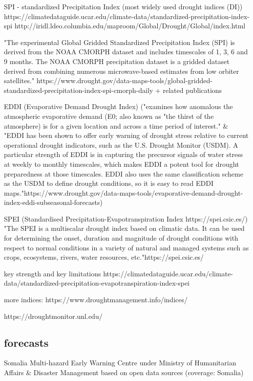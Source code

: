 SPI - standardized Precipitation Index (most widely used drought indices (DI)) 
https://climatedataguide.ucar.edu/climate-data/standardized-precipitation-index-spi
http://iridl.ldeo.columbia.edu/maproom/Global/Drought/Global/index.html

"The experimental Global Gridded Standardized Precipitation Index (SPI) is derived from the NOAA CMORPH dataset and includes timescales of 1, 3, 6 and 9 months.  The NOAA CMORPH precipitation dataset is a gridded dataset derived from combining numerous microwave-based estimates from low orbiter satellites." https://www.drought.gov/data-maps-tools/global-gridded-standardized-precipitation-index-spi-cmorph-daily + related publications

EDDI (Evaporative Demand Drought Index) ("examines how anomalous the atmospheric evaporative demand (E0; also known as "the thirst of the atmosphere) is for a given location and across a time period of interest." \& "EDDI has been shown to offer early warning of drought stress relative to current operational drought indicators, such as the U.S. Drought Monitor (USDM). A particular strength of EDDI is in capturing the precursor signals of water stress at weekly to monthly timescales, which makes EDDI a potent tool for drought preparedness at those timescales. EDDI also uses the same classification scheme as the USDM to define drought conditions, so it is easy to read EDDI maps."https://www.drought.gov/data-maps-tools/evaporative-demand-drought-index-eddi-subseasonal-forecasts)



SPEI (Standardised Precipitation-Evapotranspiration Index https://spei.csic.es/)
"The SPEI is a multiscalar drought index based on climatic data. It can be used for determining the onset, duration and magnitude of drought conditions with respect to normal conditions in a variety of natural and managed systems such as crops, ecosystems, rivers, water resources, etc."https://spei.csic.es/

key strength and key limitations https://climatedataguide.ucar.edu/climate-data/standardized-precipitation-evapotranspiration-index-spei


more indices: https://www.droughtmanagement.info/indices/

https://droughtmonitor.unl.edu/


\subsection{forecasts}
Somalia Multi-hazard Early Warning Centre under Ministry of Humanitarian Affairs & Disaster Management
based on open data sources (coverage: Somalia)

